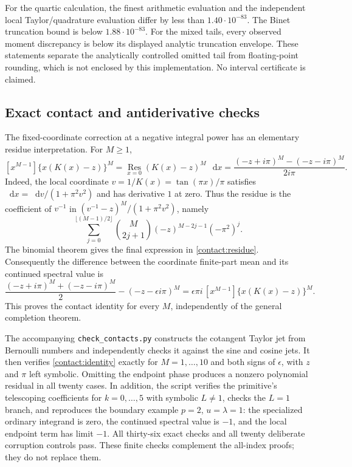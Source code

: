 \documentclass[11pt,a4paper]{article}
\numberwithin{equation}{section}
\theoremstyle{definition}
\theoremstyle{remark}
\newcommand{\dd}{\mathop{}\!\mathrm{d}}
\begin{document}
For the quartic calculation, the finest arithmetic evaluation and
the independent local Taylor/quadrature evaluation differ by less
than $1.40\cdot10^{-83}$. The Binet truncation bound is below
$1.88\cdot10^{-83}$. For the mixed tails, every observed moment
discrepancy is below its displayed analytic truncation envelope.
These statements separate the analytically controlled omitted tail
from floating-point rounding, which is not enclosed by this
implementation. No interval certificate is claimed.


\subsection{Exact contact and antiderivative checks}
\label{contact:verification}

The fixed-coordinate correction at a negative integral power has an
elementary residue interpretation.  For $M\ge1$,
\begin{equation}\label{contact:residue}
 [x^{M-1}]\{x(K(x)-z)\}^M
 =\operatorname*{Res}_{x=0}(K(x)-z)^M\,\dd x
 =\frac{(-z+i\pi)^M-(-z-i\pi)^M}{2i\pi}.
\end{equation}
Indeed, the local coordinate $v=1/K(x)=\tan(\pi x)/\pi$ satisfies
$\dd x=\dd v/(1+\pi^2v^2)$ and has derivative $1$ at zero.  Thus
the residue is the coefficient of $v^{-1}$ in
$(v^{-1}-z)^M/(1+\pi^2v^2)$, namely
\[
 \sum_{j=0}^{\lfloor(M-1)/2\rfloor}
   \binom{M}{2j+1}(-z)^{M-2j-1}(-\pi^2)^j.
\]
The binomial theorem gives the final expression in
\eqref{contact:residue}.  Consequently the difference between the
coordinate finite-part mean and its continued spectral value is
\begin{equation}\label{contact:identity}
 \frac{(-z+i\pi)^M+(-z-i\pi)^M}{2}
       -(-z-\epsilon i\pi)^M
 =\epsilon\pi i\,[x^{M-1}]\{x(K(x)-z)\}^M.
\end{equation}
This proves the contact identity for every $M$, independently of the
general completion theorem.

The accompanying \texttt{check\_contacts.py} constructs the cotangent
Taylor jet from Bernoulli numbers and independently checks it against
the sine and cosine jets.  It then verifies \eqref{contact:identity}
exactly for $M=1,\ldots,10$ and both signs of $\epsilon$, with $z$
and $\pi$ left symbolic.  Omitting the endpoint phase produces a
nonzero polynomial residual in all twenty cases.  In addition, the
script verifies the primitive's telescoping coefficients for
$k=0,\ldots,5$ with symbolic $L\ne1$, checks the $L=1$ branch, and
reproduces the boundary example $p=2$, $u=\lambda=1$: the specialized
ordinary integrand is zero, the continued spectral value is $-1$,
and the local endpoint term has limit $-1$.  All thirty-six exact
checks and all twenty deliberate corruption controls pass.  These
finite checks complement the all-index proofs; they do not replace
them.
\end{document}

